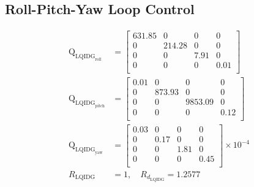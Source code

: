 \documentclass[conference]{IEEEtran}
\begin{document}
\subsection{Roll-Pitch-Yaw Loop Control}
\begin{equation}
	\begin{split}
		\boldsymbol{\mathrm{Q}}_{{\text{LQIDG}_{\text{roll}}}} &= \begin{bmatrix}
			631.85 & 0 & 0 & 0  \\ 
			0 & 214.28 & 0 & 0  \\ 
			0 & 0 & 7.91 & 0  \\ 
			0 & 0 & 0 & 0.01  \\ 
		\end{bmatrix} \\[1em]
		\boldsymbol{\mathrm{Q}}_{{\text{LQIDG}_{\text{pitch}}}} &= \begin{bmatrix}
			0.01 & 0 & 0 & 0  \\
			0 & 873.93 & 0 & 0  \\ 
			0 & 0 & 9853.09 & 0 \\ 
			0 & 0 & 0 & 0.12  \\ 
		\end{bmatrix}\\[1em]
		\boldsymbol{\mathrm{Q}}_{{\text{LQIDG}_{\text{yaw}}}}  &= \begin{bmatrix}
			0.03 & 0 & 0 & 0 \\ 
			0 & 0.17 & 0 & 0 \\ 
			0 & 0 & 1.81 & 0 \\ 
			0 & 0 & 0 & 0.45 \\
		\end{bmatrix}\times 10^{-4}\\[1em]
          R_{{\text{LQIDG}}} &= 1, \quad  R_{d_{\text{LQIDG}}} = 1.2577
	\end{split}
\end{equation}






\end{document}
